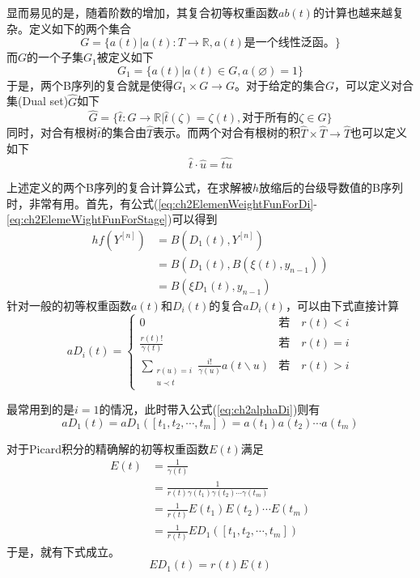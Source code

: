 显而易见的是，随着阶数的增加，其复合初等权重函数$ab(t)$的计算也越来越复杂。定义如下的两个集合
\begin{equation}
G=\{a(t)|a(t):T\to\mathbb{R},a(t)\text{是一个线性泛函。} \}
\end{equation}
而$G$的一个子集$G_1$被定义如下
\begin{equation}
G_1=\{a(t)|a(t)\in G, a(\varnothing) =1 \}
\end{equation}
于是，两个B序列的复合就是使得$G_1\times G\to G$。对于给定的集合$G$，可以定义对合集(Dual set)$\hat{G}$如下
\begin{equation}
\hat{G}=\{\hat{t}:G\to\mathbb{R}|\hat{t}(\zeta)=\zeta(t),\text{对于所有的}\zeta\in G \}
\end{equation}
同时，对合有根树$\hat{t}$的集合由$\hat{T}$表示。而两个对合有根树的积$\hat{T}\times\hat{T}\to\hat{T}$也可以定义如下
\begin{equation}
\hat{t}\cdot\hat{u}=\hat{tu}
\end{equation}

上述定义的两个B序列的复合计算公式，在求解被$h$放缩后的台级导数值的B序列时，非常有用。首先，有公式(\ref{eq:ch2ElemenWeightFunForDi}-\ref{eq:ch2ElemeWightFunForStage})可以得到
\begin{equation}
\begin{aligned}
hf(Y^{[n]})&=B(D_1(t),Y^{[n]})\\
&=B(D_1(t),B(\xi(t),y_{n-1}))\\
&=B(\xi D_1(t),y_{n-1})
\end{aligned}
\end{equation}
针对一般的初等权重函数$a(t)$和$D_i(t)$的复合$aD_i(t)$，可以由下式直接计算
\begin{equation}
aD_i(t)=\begin{cases}
0 & \text{若}\quad r(t)<i\\
\displaystyle\frac{r(t)!}{\gamma(t)} & \text{若}\quad r(t)=i\\
\displaystyle\sum\limits_{\substack{r(u)=i\\ u\prec t}}\frac{i!}{\gamma(u)}a(t\backslash u) & \text{若}\quad r(t)>i
\end{cases}\label{eq:ch2alphaDi}
\end{equation}

最常用到的是$i=1$的情况，此时带入公式(\ref{eq:ch2alphaDi})则有
\begin{equation}
aD_1(t)=aD_1([t_1,t_2,\cdots,t_m])=a(t_1)a(t_2)\cdots a(t_m)
\end{equation}

对于Picard积分的精确解的初等权重函数$E(t)$满足
\begin{equation}
\begin{aligned}
E(t)&=\frac{1}{\gamma(t)}\\
&=\frac{1}{r(t)\gamma(t_1)\gamma(t_2)\cdots\gamma(t_m)}\\
&=\frac{1}{r(t)}E(t_1)E(t_2)\cdots E(t_m)\\
&=\frac{1}{r(t)}ED_1([t_1,t_2,\cdots,t_m])
\end{aligned}
\end{equation}
于是，就有下式成立。
\begin{equation}
ED_1(t)=r(t)E(t)\label{eq:ED1}
\end{equation}

